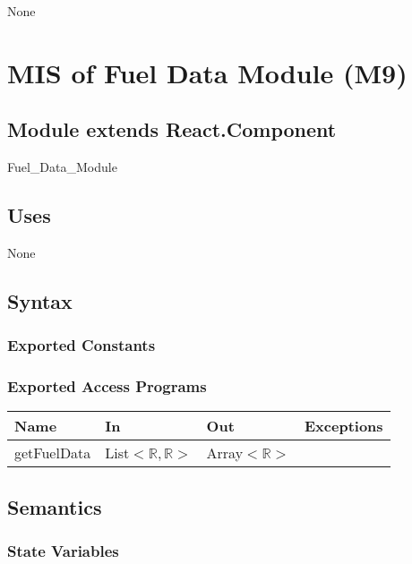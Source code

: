 \documentclass[12pt, titlepage]{article}
\begin{document}
None

\newpage



\section{MIS of Fuel Data Module (M9)} 

\label{Module} 

\subsection{Module extends React.Component}

Fuel\_Data\_Module

\subsection{Uses}

None

\subsection{Syntax}

\subsubsection{Exported Constants}

\subsubsection{Exported Access Programs}

\begin{tabular}{| l | l | l | l |}
  \hline
  \textbf{Name} & \textbf{In} & \textbf{Out} & \textbf{Exceptions}\\
  \hline
  getFuelData & List$<\mathbb{R},\mathbb{R}>$ & Array$<\mathbb{R}>$ & ~\\
  \hline
\end{tabular}

\subsection{Semantics}

\subsubsection{State Variables}
\end{document}

